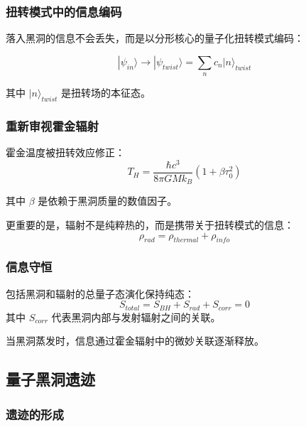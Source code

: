 \subsubsection{扭转模式中的信息编码}

落入黑洞的信息不会丢失，而是以分形核心的量子化扭转模式编码：

\begin{equation}
    |\psi_{in}\rangle \to |\psi_{twist}\rangle = \sum_n c_n |n\rangle_{twist}
\end{equation}

其中 $|n\rangle_{twist}$ 是扭转场的本征态。

\subsubsection{重新审视霍金辐射}

霍金温度被扭转效应修正：
\begin{equation}
    T_H = \frac{\hbar c^3}{8\pi GMk_B}(1 + \beta\tau_0^2)
\end{equation}

其中 $\beta$ 是依赖于黑洞质量的数值因子。

更重要的是，辐射不是纯粹热的，而是携带关于扭转模式的信息：
\begin{equation}
    \rho_{rad} = \rho_{thermal} + \rho_{info}
\end{equation}

\subsubsection{信息守恒}

\begin{theorem}[信息守恒]
包括黑洞和辐射的总量子态演化保持纯态：
\begin{equation}
    S_{total} = S_{BH} + S_{rad} + S_{corr} = 0
\end{equation}
其中 $S_{corr}$ 代表黑洞内部与发射辐射之间的关联。
\end{theorem}

当黑洞蒸发时，信息通过霍金辐射中的微妙关联逐渐释放。

\subsection{量子黑洞遗迹}

\subsubsection{遗迹的形成}

